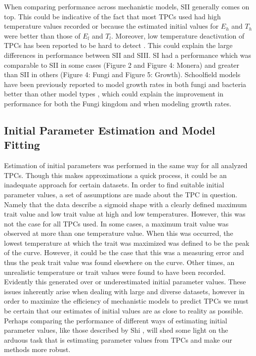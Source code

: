 \documentclass[11pt]{article}  %
\begin{document}
When comparing performance across mechanistic models, SII generally comes on top. This could be indicative of the fact that most TPCs used had high temperature values recorded or because the estimated initial values for \textit{\(E_h\)} and \textit{\(T_h\)} were better than those of \textit{\(E_l\)} and \textit{\(T_l\)}. Moreover, low temperature deactivation of TPCs has been reported to be hard to detect \cite{Pawar}. This could explain the large differences in performance between SII and SIII. SI had a performance which was comparable to SII in some cases (Figure 2 and Figure 4: Monera) and greater than SII in others (Figure 4: Fungi and Figure 5: Growth). Schoolfield models have been previously reported to model growth rates in both fungi and bacteria better than other model types \cite{Gibson,Adair}, which could explain the improvement in performance for both the Fungi kingdom and when modeling growth rates. 

\subsection*{Initial Parameter Estimation and Model Fitting}

Estimation of initial parameters was performed in the same way for all analyzed TPCs. Though this makes approximations a quick process, it could be an inadequate approach for certain datasets. In order to find suitable initial parameter values, a set of assumptions are made about the TPC in question. Namely that the data describe a sigmoid shape with a clearly defined maximum trait value and low trait value at high and low temperatures. However, this was not the case for all TPCs used. In some cases, a maximum trait value was observed at more than one temperature value. When this was occurred, the lowest temperature at which the trait was maximized was defined to be the peak of the curve. However, it could be the case that this was a measuring error and thus the peak trait value was found elsewhere on the curve. Other times, an unrealistic temperature or trait values were found to have been recorded. Evidently this generated over or underestimated initial parameter values. These issues inherently arise when dealing with large and diverse datasets, however in order to maximize the efficiency of mechanistic models to predict TPCs we must be certain that our estimates of initial values are as close to reality as possible. Perhaps comparing the performance of different ways of estimating initial parameter values, like those described by Shi \cite{Shi}, will shed some light on the arduous task that is estimating parameter values from TPCs and make our methods more robust.
\end{document}

